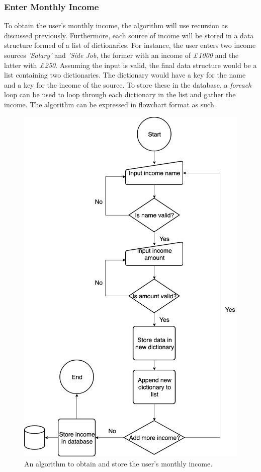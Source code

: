 \documentclass[12pt]{article}
\begin{document}
  \subsubsection{Enter Monthly Income}
  To obtain the user's monthly income, the algorithm will use recursion as discussed previously. Furthermore, each source of income will be stored in a data structure formed of a list of dictionaries. For instance, the user enters two income sources \textit{'Salary'} and \textit{'Side Job}, the former with an income of \textit{£1000} and the latter with \textit{£250}. Assuming the input is valid, the final data structure would be a list containing two dictionaries. The dictionary would have a key for the name and a key for the income of the source. To store these in the database, a \textit{foreach} loop can be used to loop through each dictionary in the list and gather the income.
  The algorithm can be expressed in flowchart format as such.
  \begin{figure}[H]
    \centering
    \includegraphics[scale=0.4]{monthly_income.png}
    \caption{An algorithm to obtain and store the user's monthly income.}
  \end{figure}
\end{document}
